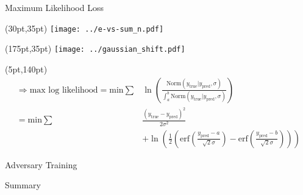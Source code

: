 \documentclass[10pt]{beamer}
\begin{document}
\begin{frame}{Maximum Likelihood Loss}
  \begin{textblock*}{150pt}(30pt,35pt)
      \texttt{[image: ../e-vs-sum\_n.pdf]}
  \end{textblock*}
  \begin{textblock*}{150pt}(175pt,35pt)
    \texttt{[image: ../gaussian\_shift.pdf]}
  \end{textblock*}

  \begin{textblock*}{150pt}(5pt,140pt)
    \begin{align*}
      \Rightarrow \text{max log likelihood} = \text{min} \sum& \ln(\frac{\text{Norm}(y_{\text{true}} | y_{\text{pred}}, \sigma)}{\int^b_a \text{Norm}(y_{\text{true}} | y_{\text{pred}}, \sigma)})\\
                                            =\text{min} \sum& \frac{(y_{\text{true}}-y_{\text{pred}})^2}{2 \sigma^2}\\
   &+\ln(\frac{1}{2} \left(\text{erf}(\frac{y_{\text{pred}}-a}{\sqrt{2}\sigma}) - \text{erf}(\frac{y_{\text{pred}}-b}{\sqrt{2}\sigma})\right))
    \end{align*}
  \end{textblock*}
\end{frame}

\begin{frame}{Adversary Training}

\end{frame}

\begin{frame}{Summary}

\end{frame}
\end{document}
